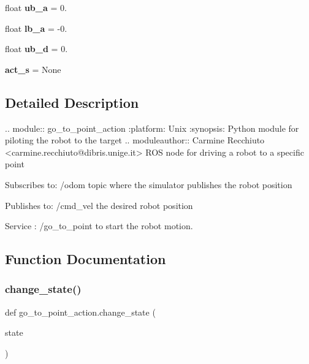 \begin{DoxyCompactItemize}
float {\bfseries ub\+\_\+a} = 0.
\item 
\mbox{\label{namespacego__to__point__action_a156fcdad5d5c28042b46d45d323a9fac}} 
float {\bfseries lb\+\_\+a} = -\/0.
\item 
\mbox{\label{namespacego__to__point__action_a05a9d1a5cc9bd5e985d6ad5247ac985d}} 
float {\bfseries ub\+\_\+d} = 0.
\item 
\mbox{\label{namespacego__to__point__action_a3994b1577d1a499ce8c7352036ee6486}} 
{\bfseries act\+\_\+s} = None
\end{DoxyCompactItemize}


\subsection{Detailed Description}
\begin{DoxyVerb}.. module:: go_to_point_action
    :platform: Unix
    :synopsis: Python module for piloting the robot to the target
.. moduleauthor:: Carmine Recchiuto <carmine.recchiuto@dibris.unige.it>
ROS node for driving a robot to a specific point

Subscribes to: /odom topic where the simulator publishes the robot position

Publishes to: /cmd_vel the desired robot position

Service : /go_to_point to start the robot motion.
\end{DoxyVerb}
 

\subsection{Function Documentation}
\mbox{\label{namespacego__to__point__action_ab7ad2629ed9ffbd5d9b7ca9c540d932a}} 
\subsubsection{\texorpdfstring{change\+\_\+state()}{change\_state()}}
{\footnotesize\ttfamily def go\+\_\+to\+\_\+point\+\_\+action.\+change\+\_\+state (\begin{DoxyParamCaption}\item[{}]{state }\end{DoxyParamCaption})}



